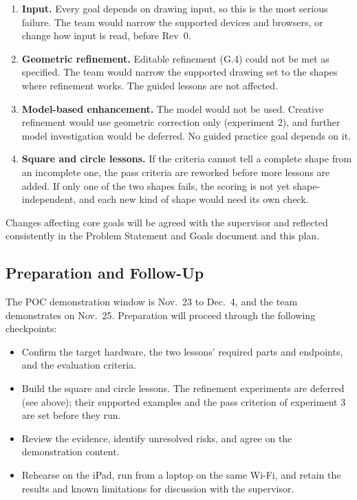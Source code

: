 \documentclass{article}
\begin{document}
\begin{enumerate}
    \item \textbf{Input.} Every goal depends on drawing input, so this is
    the most serious failure. The team would narrow the supported devices
    and browsers, or change how input is read, before Rev~0.
    \item \textbf{Geometric refinement.} Editable refinement (G.4) could not
    be met as specified. The team would narrow the supported drawing set to
    the shapes where refinement works. The guided lessons are not affected.
    \item \textbf{Model-based enhancement.} The model would not be used.
    Creative refinement would use geometric correction only (experiment 2),
    and further model investigation would be deferred. No guided practice
    goal depends on it.
    \item \textbf{Square and circle lessons.} If the criteria cannot tell a
    complete shape from an incomplete one, the pass criteria are reworked
    before more lessons are added. If only one of the two shapes fails, the
    scoring is not yet shape-independent, and each new kind of shape would
    need its own check.
\end{enumerate}

Changes affecting core goals will be agreed with the supervisor and reflected
consistently in the Problem Statement and Goals document and this plan.

\subsection{Preparation and Follow-Up}

The POC demonstration window is Nov.~23 to Dec.~4, and the team demonstrates on
Nov.~25. Preparation will proceed
through the following checkpoints:

\begin{itemize}
    \item Confirm the target hardware, the two lessons' required parts
    and endpoints, and the evaluation criteria.
    \item Build the square and circle lessons. The refinement experiments
    are deferred (see above); their supported examples and the pass
    criterion of experiment 3 are set before they run.
    \item Review the evidence, identify unresolved risks, and agree on the
    demonstration content.
    \item Rehearse on the iPad, run from a laptop on the same Wi-Fi, and
    retain the results
    and known limitations for discussion with the supervisor.
\end{itemize}
\end{document}

